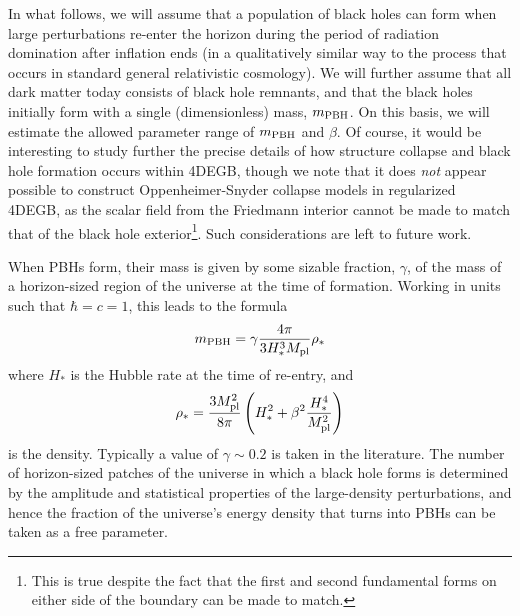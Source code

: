 \documentclass[reprint,amsmath,amssymbGaps,onecolumn,notitlepage,nofootinbib]{revtex4-1}
\newcommand{\mpl}{M_{\rm pl}}
\begin{document}
In what follows, we will assume that a population of black holes can form when large perturbations re-enter the horizon during the period of radiation domination after inflation ends (in  a qualitatively similar way to the process that occurs in standard general relativistic cosmology). We will further assume that 
all dark matter today consists of black hole remnants, and that the black holes initially form with a single (dimensionless) mass, $m_{\rm PBH}$. On this basis, we will estimate the allowed parameter range of $m_{\rm PBH}$ and $\beta$. Of course, it would be interesting to study further the precise details of how structure collapse and black hole formation occurs within 4DEGB, though we note that it does {\it not} appear possible to construct Oppenheimer-Snyder collapse models in regularized 4DEGB, as the scalar field from the Friedmann interior cannot be made to match that of the black hole exterior\footnote{This is true despite the fact that the first and second fundamental forms on either side of the boundary can be made to match.}. Such considerations are left to future work.

When PBHs form, their mass is given by some sizable fraction, $\gamma$, of the mass of a horizon-sized region of the universe at the time of formation. Working in units such that $\hbar=c=1$, this leads to the formula 
\begin{equation}
m_{\rm PBH} = \gamma \frac{4 \pi }{3 H_{*}^3 \mpl} \rho_*
\label{eq:PBH1}
\end{equation}
where $H_*$ is the Hubble rate at the time of re-entry, and
\begin{equation}
    \rho_*=\frac{3\mpl^2}{8\pi} \left( H_*^2 + \beta^2 \frac{H_*^4}{\mpl^2}\right)
    \label{eq:PBH2}
\end{equation}
is the density.  
Typically a value of $\gamma \sim 0.2$ is taken in the literature. The number of horizon-sized patches 
of the universe in which a black hole forms is determined 
by the amplitude and statistical properties of the large-density perturbations, and hence the fraction
of the universe's energy density that 
turns into PBHs can be taken as a free parameter.
\end{document}
